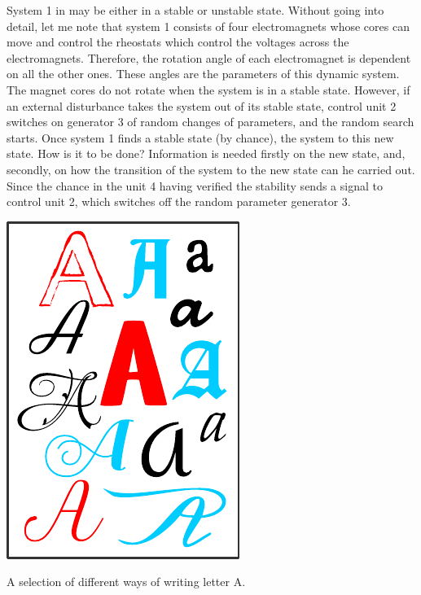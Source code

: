 System 1 in  may be either in a stable or unstable state.
Without going into detail, let me note that system 1 consists of four
electromagnets whose cores can move and control the rheostats which
control the voltages across the electromagnets. Therefore, the rotation
angle of each electromagnet is dependent on all the other ones. These
angles are the parameters of this dynamic system. The magnet cores do
not rotate when the system is in a stable state. However, if an external
disturbance takes the system out of its stable state, control unit
2 switches on generator 3 of random changes of parameters, and the
random search starts. Once system 1 finds a stable state (by chance),
the system to this new state. How is it to be done? Information is
needed firstly on the new state, and, secondly, on how the transition of
the system to the new state can he carried out. Since the chance in the
unit 4 having verified the stability sends a signal to control unit 2, which
switches off the random parameter generator 3.
\begin{marginfigure}[-2cm]%
 \centering
 \includegraphics[width=0.9\linewidth]{figures/fonts.pdf}
\caption{A selection of different ways of writing letter A.}
\label{fonts}
 \end{marginfigure}
